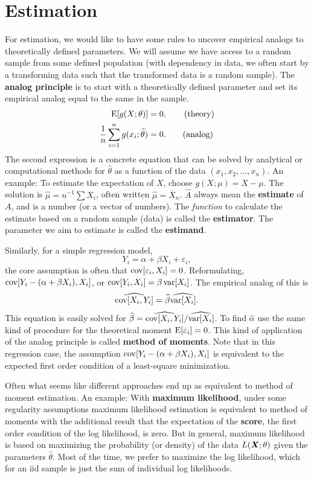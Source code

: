 \documentclass[10pt]{article}
\begin{document}
\section{Estimation}

For estimation, we would like to have some rules to uncover empirical analogs
to theoretically defined parameters. We will assume we have access to a
random sample from some defined population (with dependency in data,
we often start by a transforming data such that the transformed data
is a random sample). 
The \textbf{analog principle} is to 
start with a theoretically defined parameter and set its
empirical analog equal to the same in the sample. 
\begin{align}
  \operatorname{E}[g(X;\theta)] &= 0, \tag{theory} \\
  \frac{1}{n}\sum_{i=1}^n g(x_i;\widehat{\theta}) &= 0. \tag{analog} 
\end{align}
The second expression is a concrete equation that can be solved by analytical 
or computational methods for $\widehat{\theta}$ as a function of the data $(x_1,x_2,\dots,x_n)$.
An example: To estimate the expectation of $X$, choose $g(X;\mu)=X-\mu$.
The solution is  $\widehat{\mu} = n^{-1}\sum X_i$,
often written $\widehat{\mu}=\overline{X}_n$. 
$\widehat{A}$ always mean the \textbf{estimate} of $A$, and is a number (or a vector of numbers). 
The \emph{function} to calculate the estimate based on a random sample (data) is called 
the \textbf{estimator}.  The parameter we aim to estimate is called the \textbf{estimand}.


Similarly, for a simple regression model,
\[ Y_i = \alpha + \beta X_i + \varepsilon_i,\] the core assumption is often that $\operatorname{cov}[\varepsilon_i,X_i]=0$.
Reformulating, $\operatorname{cov}[Y_i - (\alpha + \beta X_i), X_i]$, or $\operatorname{cov}[Y_i,X_i] = \beta \operatorname{var}[X_i]$.
The empirical analog of this is 
\[ \widehat{\operatorname{cov}[X_i,Y_i]} = \widehat{\beta} \widehat{\operatorname{var}[X_i]}.\]
This equation
is easily solved for $\widehat{\beta} = \widehat{\operatorname{cov}[X_i,Y_i]} / \widehat{\operatorname{var}[X_i]}$.  To find
$\widehat{\alpha}$ use the same kind of procedure for the theoretical moment $\operatorname{E}[\varepsilon_i]=0$. This kind
of application of the analog principle is called \textbf{method of moments}. Note
that in this regression case, the assumption $\operatorname{cov}[Y_i - (\alpha + \beta X_i), X_i]$ is equivalent
to the expected first order condition of a least-square minimization.

Often what seems like different approaches end up as equivalent to method of moment estimation.
An example: With \textbf{maximum likelihood}, under some regularity assumptions maximum likelihood 
estimation is equivalent to method of moments with the additional result that the expectation 
of the \textbf{score}, the first order condition of the log likelihood, is zero. But in general,
maximum likelihood is based on maximizing the probability (or density) of the data $L(\bm X;\theta)$ 
given the parameters $\widehat{\theta}$. Most of the time, we prefer to maximize the log likelihood,
which for an iid sample is just the sum of individual log likelihoods.
\end{document}
